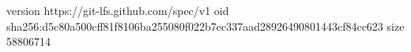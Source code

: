 version https://git-lfs.github.com/spec/v1
oid sha256:d5c80a500cff81f8106ba255080f022b7ec337aad28926490801443cf84cc623
size 58806714
